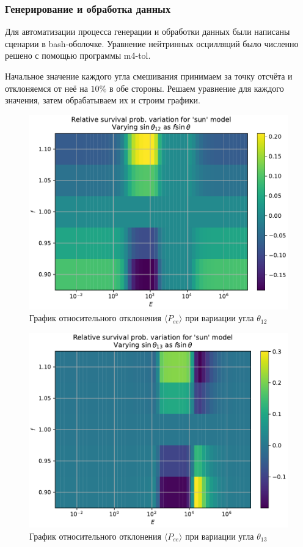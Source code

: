 \documentclass[utf8,9pt,mathserif,usepdftitle=false]{beamer}
\begin{document}
\begin{frame}
	\frametitle{Генерирование и обработка данных}%
  Для автоматизации процесса генерации и обработки данных были написаны сценарии
  в bash-оболочке. Уравнение нейтринных осцилляций было численно решено с
  помощью программы m4-tol. 
  
  Начальное значение каждого угла смешивания принимаем за точку отсчёта и отклоняемся от неё на \(10\%\) в обе стороны. Решаем уравнение для каждого значения, затем обрабатываем их и строим графики. 

\end{frame}

\begin{frame}
	\begin{figure}[h]
		\centering
		\includegraphics[width=0.8\linewidth]{sun-in-ang12}
		\caption{График относительного отклонения \(\langle P_{ee}\rangle\) при вариации угла \(\theta_{12}\) }
	\end{figure}
\end{frame}

\begin{frame}
	\begin{figure}[h]
		\centering
		\includegraphics[width=0.8\linewidth]{sun-in-ang13}
		\caption{График относительного отклонения \(\langle P_{ee}\rangle\) при вариации угла \(\theta_{13}\)}
	\end{figure}
\end{frame}
\end{document}
